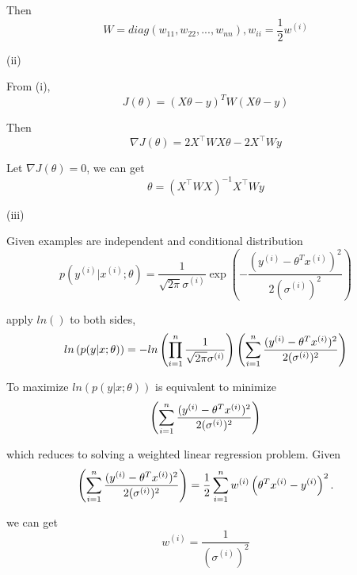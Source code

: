 \begin{answer}
Then 
\begin{equation*}
    W = diag(w_{11}, w_{22}, ..., w_{nn}), w_{ii} = \frac{1}{2} w^{(i)}
\end{equation*}

(ii)

From (i), 
\begin{equation*}
    J(\theta) = (X\theta - {y})^T W (X\theta - {y})
\end{equation*}

Then 
\begin{equation*}
    \nabla J(\theta) = 2 X ^ \top W X \theta - 2 X^\top W y
\end{equation*}

Let $\nabla J(\theta) = 0$, we can get
\begin{equation*}
    \theta = (X ^ \top W X)^{-1} X^\top W y
\end{equation*}

(iii)

Given examples are independent and conditional distribution
\begin{equation*}
    p(y^{(i)} | x^{(i)} ; \theta) = \frac{1}{\sqrt{2\pi}\sigma^{(i)}} \exp\left(-
    \frac{(y^{(i)} - \theta^Tx^{(i)})^2}{2(\sigma^{(i)})^2}\right)
\end{equation*}

apply $ln()$ to both sides,
\begin{equation*}
    ln \left(p(y | x ; \theta) \right) = - ln\left( \prod_{i=1}^{n} \frac{1}{\sqrt{2\pi}\sigma^{(i)}} \right) \left( \sum_{i=1}^{n} \frac{(y^{(i)} - \theta^Tx^{(i)})^2}{2(\sigma^{(i)})^2} \right)
\end{equation*}

To maximize $ln \left(p(y | x ; \theta) \right)$ is equivalent to minimize 
\begin{equation*}
\left( \sum_{i=1}^{n} \frac{(y^{(i)} - \theta^Tx^{(i)})^2}{2(\sigma^{(i)})^2} \right)
\end{equation*}

which reduces to solving a weighted linear regression problem. Given 
\begin{equation*}
\left( \sum_{i=1}^{n} \frac{(y^{(i)} - \theta^Tx^{(i)})^2}{2(\sigma^{(i)})^2} \right) = \frac{1}{2} \sum_{i=1}^{n} w^{(i)}
		\left(\theta^Tx^{(i)} - y^{(i)}\right)^2.
\end{equation*}

we can get 
\begin{equation*}
w^{(i)} = \frac{1}{{(\sigma^{(i)})^2}}
\end{equation*}
\end{answer}

